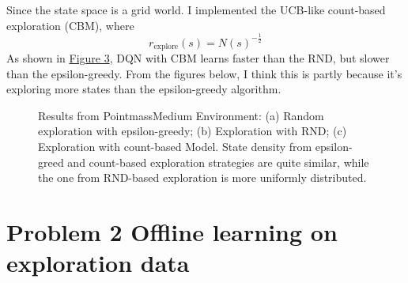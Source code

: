 \documentclass[10pt, letterpaper]{article}
\begin{document}
Since the state space is a grid world. I implemented the UCB-like count-based exploration (CBM), where 
\begin{equation}
    r_{\text{explore}}(s) = N(s)^{-\frac{1}{2}}
\end{equation}
As shown in \hyperref[fig:3]{Figure 3}, DQN with CBM learns faster than the RND, but slower than the epsilon-greedy. From the figures below, I think this is partly because it's exploring more states than the epsilon-greedy algorithm.

\begin{figure}[h!]
    \centering
    \caption{Results from PointmassMedium Environment: (a) Random exploration with epsilon-greedy; (b) Exploration with RND; (c) Exploration with count-based Model. State density from epsilon-greed and count-based exploration strategies are quite similar, while the one from RND-based exploration is more uniformly distributed.}
    \label{fig:4}
\end{figure}


\pagebreak
\section*{Problem 2 Offline learning on exploration data}
\end{document}
